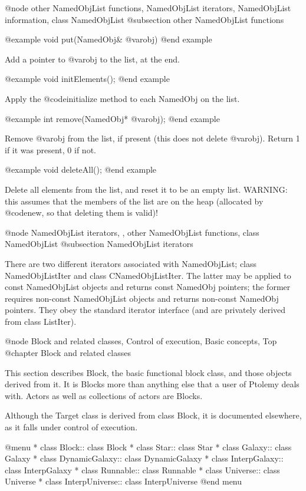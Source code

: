 @node other NamedObjList functions, NamedObjList iterators, NamedObjList information, class NamedObjList
@subsection other NamedObjList functions

@example
void put(NamedObj& @var{obj})
@end example

Add a pointer to @var{obj} to the list, at the end.

@example
void initElements();
@end example

Apply the @code{initialize} method to each NamedObj on the list.

@example
int remove(NamedObj* @var{obj});
@end example

Remove @var{obj} from the list, if present (this does not delete
@var{obj}).  Return 1 if it was present, 0 if not.

@example
void deleteAll();
@end example

Delete all elements from the list, and reset it to be an empty list.
WARNING: this assumes that the members of the list are on the heap
(allocated by @code{new}, so that deleting them is valid)!

@node NamedObjList iterators,  , other NamedObjList functions, class NamedObjList
@subsection NamedObjList iterators

There are two different iterators associated with NamedObjList;
class NamedObjListIter and class CNamedObjListIter.  The latter may
be applied to const NamedObjList objects and returns const NamedObj
pointers; the former requires non-const NamedObjList objects and
returns non-const NamedObj pointers.  They obey the standard iterator
interface (and are privately derived from class ListIter).

@node Block and related classes, Control of execution, Basic concepts, Top
@chapter Block and related classes

This section describes Block, the basic functional block class, and
those objects derived from it.  It is Blocks more than anything else
that a user of Ptolemy deals with.  Actors as well as collections of
actors are Blocks.

Although the Target class is derived from class Block, it is documented
elsewhere, as it falls under control of execution.

@menu
* class Block::                 class Block
* class Star::                  class Star
* class Galaxy::                class Galaxy
* class DynamicGalaxy::         class DynamicGalaxy
* class InterpGalaxy::          class InterpGalaxy
* class Runnable::              class Runnable
* class Universe::              class Universe
* class InterpUniverse::        class InterpUniverse
@end menu

